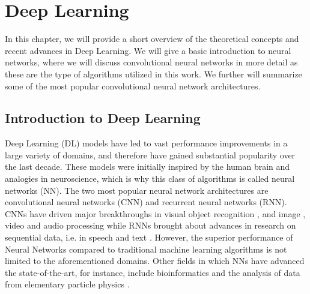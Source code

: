 
\chapter{Deep Learning} %

\label{Chapter2} %


In this chapter, we will provide a short overview of the theoretical concepts and recent advances in Deep Learning. We will give a basic introduction to neural networks, where we will discuss convolutional neural networks in more detail as these are the type of algorithms utilized in this work. We further will summarize some of the most popular convolutional neural network architectures.




\section{Introduction to Deep Learning}

Deep Learning (DL) models have led to vast performance improvements in a large variety of domains, and therefore have gained substantial popularity over the last decade. These models were initially inspired by the human brain and analogies in neuroscience, which is why this class of algorithms is called neural networks (NN). The two most popular neural network architectures are convolutional neural networks (CNN) and recurrent neural networks (RNN). CNNs have driven major breakthroughs in visual object recognition \parencite{krizhevsky2012}, and image \parencite{zhang2015}, video \parencite{tompson2014} and audio \parencite{hinton2012} processing while RNNs brought about advances in research on sequential data, i.e. in speech and text \parencite{collobert2011}. However, the superior performance of Neural Networks compared to traditional machine learning algorithms is not limited to the aforementioned domains. Other fields in which NNs have advanced the state-of-the-art, for instance, include bioinformatics \parencite{junshui2015} and the analysis of data from elementary particle physics \parencite{ciodaroc2012}.


